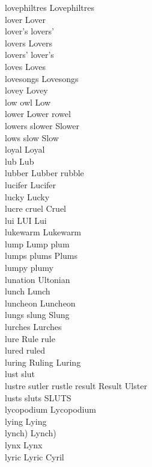 lovephiltres Lovephiltres\\
lover Lover\\
lover's lovers'\\
lovers Lovers\\
lovers' lover's\\
loves Loves\\
lovesongs Lovesongs\\
lovey Lovey\\
low owl Low\\
lower Lower rowel\\
lowers slower Slower\\
lows slow Slow\\
loyal Loyal\\
lub Lub\\
lubber Lubber rubble\\
lucifer Lucifer\\
lucky Lucky\\
lucre cruel Cruel\\
lui LUI Lui\\
lukewarm Lukewarm\\
lump Lump plum\\
lumps plums Plums\\
lumpy plumy\\
lunation Ultonian\\
lunch Lunch\\
luncheon Luncheon\\
lungs slung Slung\\
lurches Lurches\\
lure Rule rule\\
lured ruled\\
luring Ruling Luring\\
lust slut\\
lustre sutler rustle result Result Ulster\\
lusts sluts SLUTS\\
lycopodium Lycopodium\\
lying Lying\\
lynch) Lynch)\\
lynx Lynx\\
lyric Lyric Cyril\\

